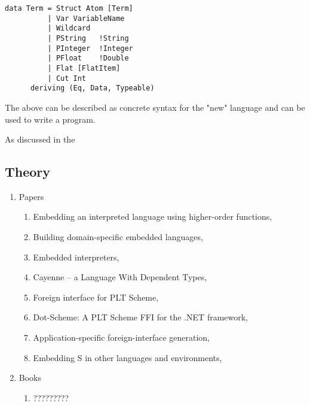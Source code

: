 \documentclass[proposal.tex]{subfiles}
\begin{document}
\begin{verbatim}
data Term = Struct Atom [Term]
          | Var VariableName
          | Wildcard
          | PString   !String
          | PInteger  !Integer
          | PFloat    !Double
          | Flat [FlatItem]
          | Cut Int
      deriving (Eq, Data, Typeable)
\end{verbatim}

The above can be described as concrete syntax for the "new" language and can be used to write a program.  


As discussed in the 

\subsection{Theory}
\begin{enumerate}
\item Papers
\begin{enumerate}
\item Embedding an interpreted language using higher-order functions, \cite{ramsey2003embedding}
\item Building domain-specific embedded languages, \cite{hudak1996building}
\item Embedded interpreters, \cite{benton2005embedded}
\item Cayenne -- a Language With Dependent Types, \cite{Augustsson98cayenne--}
\item Foreign interface for PLT Scheme, \cite{barzilay2004foreign}
\item Dot-Scheme: A PLT Scheme FFI for the .NET framework, \cite{pinto2003dot}
\item Application-specific foreign-interface generation, \cite{reppy2006application}
\item Embedding S in other languages and environments, \cite{lang2001embedding}
\end{enumerate}
\item Books
\begin{enumerate}
\item ?????????
\end{enumerate}

\end{enumerate}
\end{document}
